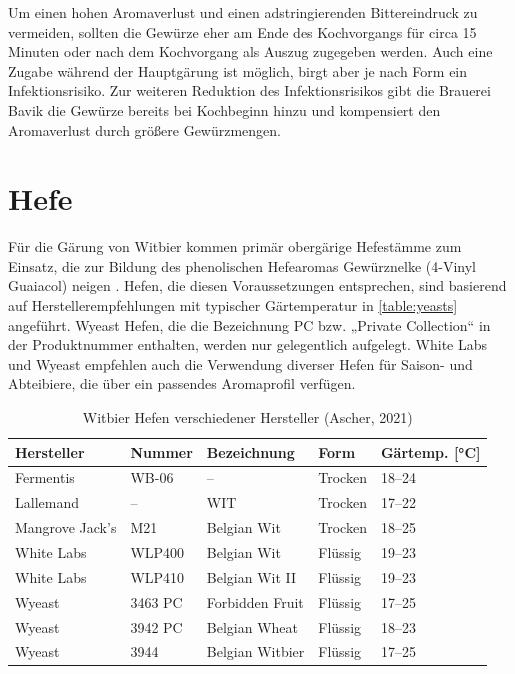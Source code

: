 \documentclass[a4paper,parskip=half]{scrartcl}
\begin{document}
Um einen hohen Aromaverlust und einen adstringierenden Bittereindruck zu vermeiden,
sollten die Gewürze eher am Ende des Kochvorgangs für circa 15 Minuten
oder nach dem Kochvorgang als Auszug zugegeben werden.
Auch eine Zugabe während der Hauptgärung ist möglich,
birgt aber je nach Form ein Infektionsrisiko.
Zur weiteren Reduktion des Infektionsrisikos gibt die Brauerei
Bavik die Gewürze bereits bei Kochbeginn hinzu und kompensiert den
Aromaverlust durch größere Gewürzmengen. \parencites[17\psq]{Strottner1999} [62]{Hieronymus2010}

\section*{Hefe}

Für die Gärung von Witbier kommen primär obergärige Hefestämme
zum Einsatz, die zur Bildung des phenolischen Hefearomas
Gewürznelke (4-Vinyl Guaiacol) neigen \parencite[46]{Roncoroni2018}.
Hefen, die diesen Voraussetzungen entsprechen, sind
basierend auf Herstellerempfehlungen mit typischer Gärtemperatur
in \autoref{table:yeasts} angeführt. Wyeast Hefen, die die
Bezeichnung PC bzw. „Private Collection“ in der Produktnummer enthalten,
werden nur gelegentlich aufgelegt. White Labs und Wyeast empfehlen
auch die Verwendung diverser Hefen für Saison- und Abteibiere,
die über ein passendes Aromaprofil verfügen.

\begin{table}[H]
\centering
\begin{tabular}{lllll}
\toprule
Hersteller      & Nummer  & Bezeichnung          & Form    & Gärtemp. [°C] \\
\midrule
Fermentis       & WB-06   & –                    & Trocken & 18–24        \\
Lallemand       & –       & WIT                  & Trocken & 17–22        \\
Mangrove Jack's & M21     & Belgian Wit          & Trocken & 18–25        \\
White Labs      & WLP400  & Belgian Wit          & Flüssig & 19–23        \\
White Labs      & WLP410  & Belgian Wit II       & Flüssig & 19–23        \\
Wyeast          & 3463 PC & Forbidden Fruit      & Flüssig & 17–25        \\
Wyeast          & 3942 PC & Belgian Wheat        & Flüssig & 18–23        \\
Wyeast          & 3944    & Belgian Witbier      & Flüssig & 17–25        \\
\bottomrule
\end{tabular}
\caption{Witbier Hefen verschiedener Hersteller (Ascher, 2021)}
\label{table:yeasts}
\end{table}
\end{document}
